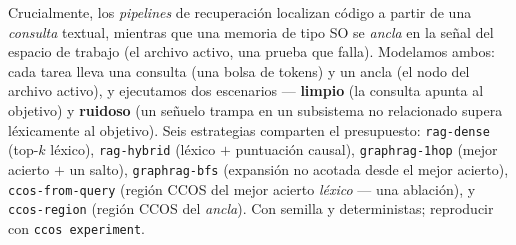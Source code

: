 \documentclass[11pt]{article}
\newcommand{\code}[1]{\texttt{#1}}
\begin{document}
Crucialmente, los \emph{pipelines} de recuperación localizan código a partir de una
\emph{consulta} textual, mientras que una memoria de tipo SO se \emph{ancla} en la
señal del espacio de trabajo (el archivo activo, una prueba que falla). Modelamos
ambos: cada tarea lleva una consulta (una bolsa de tokens) y un ancla (el nodo del
archivo activo), y ejecutamos dos escenarios --- \textbf{limpio} (la consulta apunta
al objetivo) y \textbf{ruidoso} (un señuelo trampa en un subsistema no relacionado
supera léxicamente al objetivo). Seis estrategias comparten el presupuesto:
\code{rag-dense} (top-$k$ léxico), \code{rag-hybrid} (léxico $+$ puntuación causal),
\code{graphrag-1hop} (mejor acierto $+$ un salto), \code{graphrag-bfs} (expansión no
acotada desde el mejor acierto), \code{ccos-from-query} (región CCOS del mejor acierto
\emph{léxico} --- una ablación), y \code{ccos-region} (región CCOS del \emph{ancla}).
Con semilla y deterministas; reproducir con \code{ccos experiment}.
\end{document}
